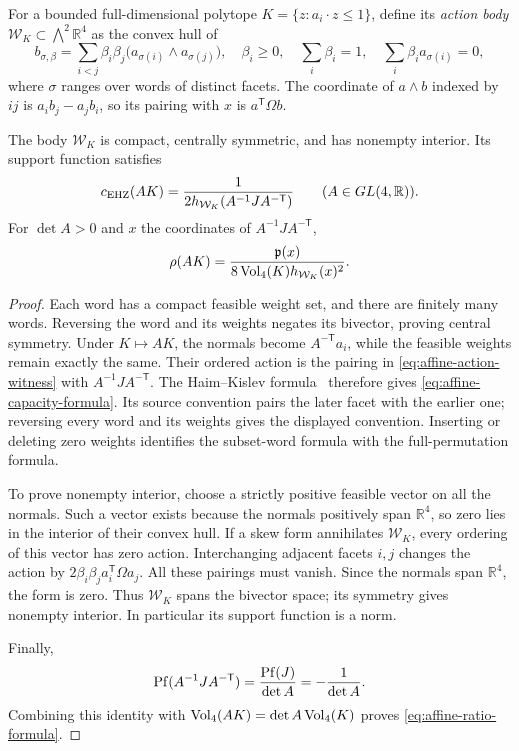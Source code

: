 For a bounded full-dimensional polytope
$K=\{z:a_i\cdot z\leq1\}$, define its \emph{action body}
$\mathcal W_K\subset\bigwedge^2\mathbb R^4$ as the convex hull of
\begin{equation}
 b_{\sigma,\beta}
 =\sum_{i<j}\beta_i\beta_j
     \bigl(a_{\sigma(i)}\wedge a_{\sigma(j)}\bigr),
 \quad
 \beta_i\geq0,\quad \sum_i\beta_i=1,\quad
 \sum_i\beta_i a_{\sigma(i)}=0,
 \label{eq:affine-action-witness}
\end{equation}
where $\sigma$ ranges over words of distinct facets. The coordinate of
$a\wedge b$ indexed by $ij$ is $a_i b_j-a_j b_i$, so its pairing with $x$
is $a^{\mathsf T}\Omega b$.

\begin{lemma}
\label{lem:affine-action-body}
The body $\mathcal W_K$ is compact, centrally symmetric, and has nonempty
interior. Its support function satisfies
\begin{equation}
 c_{\mathrm{EHZ}}(AK)
 =\frac{1}{2h_{\mathcal W_K}(A^{-1}JA^{-\mathsf T})}
 \qquad(A\in GL(4,\mathbb R)).
 \label{eq:affine-capacity-formula}
\end{equation}
For $\det A>0$ and $x$ the coordinates of $A^{-1}JA^{-\mathsf T}$,
\begin{equation}
 \rho(AK)=\frac{\mathfrak p(x)}
 {8\operatorname{Vol}_4(K)h_{\mathcal W_K}(x)^2}.
 \label{eq:affine-ratio-formula}
\end{equation}
\end{lemma}

\begin{proof}
Each word has a compact feasible weight set, and there are finitely many
words. Reversing the word and its weights negates its bivector, proving
central symmetry. Under $K\mapsto AK$, the normals become
$A^{-\mathsf T}a_i$, while the feasible weights remain exactly the same.
Their ordered action is the pairing in
\eqref{eq:affine-action-witness} with $A^{-1}JA^{-\mathsf T}$.
The Haim--Kislev formula~\cite{HK2017} therefore gives
\eqref{eq:affine-capacity-formula}. Its source convention pairs the later
facet with the earlier one; reversing every word and its weights gives the
displayed convention. Inserting or deleting zero weights identifies the
subset-word formula with the full-permutation formula.

To prove nonempty interior, choose a strictly positive feasible vector on
all the normals. Such a vector exists because the normals positively span
$\mathbb R^4$, so zero lies in the interior of their convex hull. If a skew
form annihilates $\mathcal W_K$, every ordering of this vector has zero
action. Interchanging adjacent facets $i,j$ changes the action by
$2\beta_i\beta_j a_i^{\mathsf T}\Omega a_j$. All these pairings must
vanish. Since the normals span $\mathbb R^4$, the form is zero. Thus
$\mathcal W_K$ spans the bivector space; its symmetry gives nonempty
interior. In particular its support function is a norm.

Finally,
\[
 \operatorname{Pf}(A^{-1}JA^{-\mathsf T})=\frac{\operatorname{Pf}(J)}{\det A}=-\frac1{\det A}.
\]
Combining this identity with $\operatorname{Vol}_4(AK)=\det A\operatorname{Vol}_4(K)$ proves
\eqref{eq:affine-ratio-formula}.
\end{proof}

